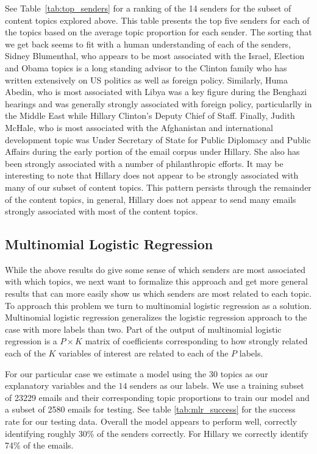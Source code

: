 \documentclass[12pt]{article}
\theoremstyle{definition}
\theoremstyle{algodesc}
\begin{document}
See Table~\ref{tab:top_senders} for a ranking of the 14 senders for the subset of content topics explored above.  This table presents the top five senders for each of the topics based on the average topic proportion for each sender.  The sorting that we get back seems to fit with a human understanding of each of the senders, Sidney Blumenthal, who appears to be most associated with the Israel, Election and Obama topics is a long standing advisor to the Clinton family who has written extensively on US politics as well as foreign policy.  Similarly, Huma Abedin, who is most associated with Libya was a key figure during the Benghazi hearings and was generally strongly associated with foreign policy, particularlly in the Middle East while Hillary Clinton's Deputy Chief of Staff.  Finally, Judith McHale, who is most associated with the Afghanistan and international development topic was Under Secretary of State for Public Diplomacy and Public Affairs during the early portion of the email corpus under Hillary.  She also has been strongly associated with a number of philanthropic efforts.  It may be interesting to note that Hillary does not appear to be strongly associated with many of our subset of content topics.  This pattern persists through the remainder of the content topics, in general, Hillary does not appear to send many emails strongly associated with most of the content topics.

\subsection{Multinomial Logistic Regression}

While the above results do give some sense of which senders are most associated with which topics, we next want to formalize this approach and get more general results that can more easily show us which senders are most related to each topic.  To approach this problem we turn to multinomial logistic regression as a solution.  Multinomial logistic regression generalizes the logistic regression approach to the case with more labels than two.  Part of the output of multinomial logistic regression is a $P \times K$ matrix of coefficients corresponding to how strongly related each of the $K$ variables of interest are related to each of the $P$ labels.

For our particular case we estimate a model using the $30$ topics as our explanatory variables and the $14$ senders as our labels.  We use a training subset of 23229 emails and their corresponding topic proportions to train our model and a subset of 2580 emails for testing.  See table \ref{tab:mlr_success} for the success rate for our testing data.  Overall the model appears to perform well, correctly identifying roughly 30\% of the senders correctly.  For Hillary we correctly identify 74\% of the emails.
\end{document}
